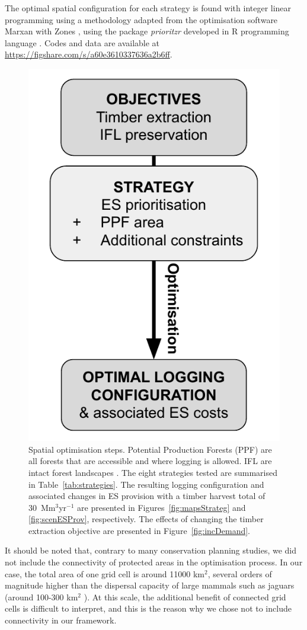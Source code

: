 \documentclass[12pt]{article}
\begin{document}
The optimal spatial configuration for each strategy is found with integer linear programming using a methodology adapted from the optimisation software Marxan with Zones \cite{Watts2009,Beyer2016}, using the package \textit{prioritzr} \cite{Hanson2018} developed in R programming language \cite{RCoreTeam2017}. Codes and data are available at \url{https://figshare.com/s/a60e3610337636a2b6ff}. 

\begin{figure}
    \centering
    \includegraphics[width = 0.4\linewidth]{graphs/diagramSpatOptim}
    \caption{Spatial optimisation steps. Potential Production Forests (PPF) are all forests that are accessible and where logging is allowed. IFL are intact forest landscapes \cite{Potapov2017}. The eight strategies tested are summarised in Table~\ref{tab:strategies}. The resulting logging configuration and associated changes in ES provision with a timber harvest total of 30~Mm$^3$yr$^{-1}$ are presented in Figures~\ref{fig:mapsStrateg} and \ref{fig:scenESProv}, respectively. The effects of changing the timber extraction objective are presented in Figure~\ref{fig:incDemand}.}
    \label{fig:basicDiagram}
\end{figure}

It should be noted that, contrary to many conservation planning studies, we did not include the connectivity of protected areas in the optimisation process. In our case, the total area of one grid cell is around 11000 km$^2$, several orders of magnitude higher than the dispersal capacity of large mammals such as jaguars (around 100-300 km$^2$ \cite{Bernal-Escobar2015}). At this scale, the additional benefit of connected grid cells is difficult to interpret, and this is the reason why we chose not to include connectivity in our framework.
\end{document}

